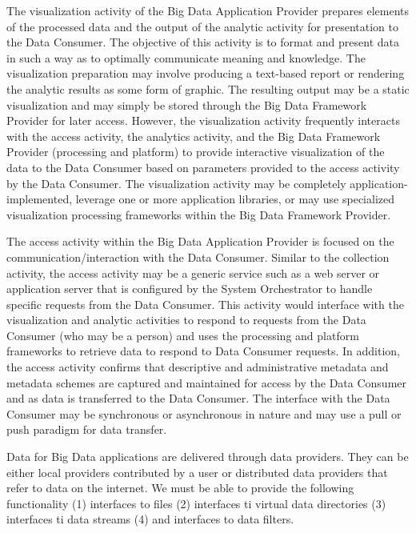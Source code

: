 \documentclass[9pt,twocolumn]{styles/osajnl}
\newcounter{subsubsubsection}[subsubsection]
\begin{document}
The visualization activity of the Big Data Application Provider prepares elements of the processed data and the output of the analytic activity for presentation to the Data Consumer. The objective of this activity is to format and present data in such a way as to optimally communicate meaning and knowledge. The visualization preparation may involve producing a text-based report or rendering the analytic results as some form of graphic. The resulting output may be a static visualization and may simply be stored through the Big Data Framework Provider for later access. However, the visualization activity frequently interacts with the access activity, the analytics activity, and the Big Data Framework Provider (processing and platform) to provide interactive visualization of the data to the Data Consumer based on parameters provided to the access activity by the Data Consumer. The visualization activity may be completely application-implemented, leverage one or more application libraries, or may use specialized visualization processing frameworks within the Big Data Framework Provider. 


The access activity within the Big Data Application Provider is focused on the communication/interaction with the Data Consumer. Similar to the collection activity, the access activity may be a generic service such as a web server or application server that is configured by the System Orchestrator to handle specific requests from the Data Consumer. This activity would interface with the visualization and analytic activities to respond to requests from the Data Consumer (who may be a person) and uses the processing and platform frameworks to retrieve data to respond to Data Consumer requests. In addition, the access activity confirms that descriptive and administrative metadata and metadata schemes are captured and maintained for access by the Data Consumer and as data is transferred to the Data Consumer. The interface with the Data Consumer may be synchronous or asynchronous in nature and may use a pull or push paradigm for data transfer. 


Data for Big Data applications are delivered through data providers. They can be either local providers contributed by a user or distributed data providers that refer to data on the internet.  We must be able to provide the following functionality (1) interfaces to files (2) interfaces ti virtual data directories (3) interfaces ti data streams (4) and interfaces to data filters.
\end{document}

